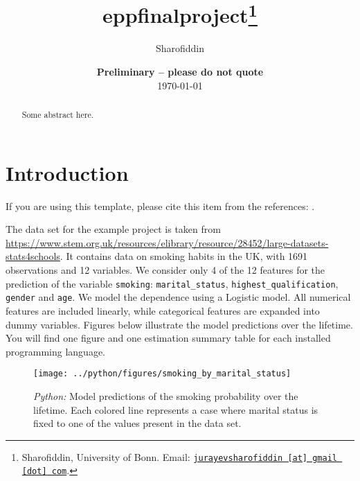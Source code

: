 \documentclass[11pt, a4paper, leqno]{article}
\begin{document}
\title{eppfinalproject\thanks{Sharofiddin, University of Bonn. Email: \href{mailto:jurayevsharofiddin@gmail.com}{\nolinkurl{jurayevsharofiddin [at] gmail [dot] com}}.}}

\author{Sharofiddin}

\date{
    {\bf Preliminary -- please do not quote}
    \\[1ex]
    \today
}

\maketitle


\begin{abstract}
    Some abstract here.
\end{abstract}

\clearpage


\section{Introduction} %
\label{sec:introduction}

If you are using this template, please cite this item from the references:
\citet{GaudeckerEconProjectTemplates}.

The data set for the example project is taken from
\url{https://www.stem.org.uk/resources/elibrary/resource/28452/large-datasets-stats4schools}.
It contains data on smoking habits in the UK, with 1691 observations and 12 variables.
We consider only 4 of the 12 features for the prediction of the variable
\texttt{smoking}: \texttt{marital\_status}, \texttt{highest\_qualification},
\texttt{gender} and \texttt{age}. We model the dependence using a Logistic model. All
numerical features are included linearly, while categorical features are expanded into
dummy variables. Figures below illustrate the model predictions over the lifetime. You
will find one figure and one estimation summary table for each installed programming
language.



\begin{figure}[H]

    \centering
    \texttt{[image: ../python/figures/smoking\_by\_marital\_status]}

    \caption{\emph{Python:} Model predictions of the smoking probability over the
        lifetime. Each colored line represents a case where marital status is fixed to one
        of the values present in the data set.}
    \label{fig:python-predictions}

\end{figure}
\end{document}
